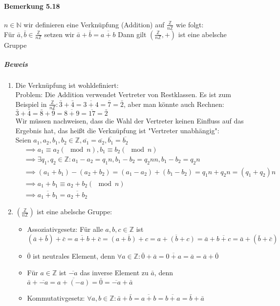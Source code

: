 \documentclass[a4paper]{scrartcl}
\DeclareMathOperator{\Forall}{\forall}
\theoremstyle{definition}
\theoremstyle{plain}
\theoremstyle{plain}
\theoremstyle{remark}
\theoremstyle{remark}
\theoremstyle{remark}
\theoremstyle{remark}
\theoremstyle{remark}
\begin{document}
\paragraph{Bemerkung 5.18}
\label{sec-3-1-7-4}
$n\in\mathbb{N}$ wir definieren eine Verknüpfung (Addition) auf $\frac{\mathbb{Z}}{n\mathbb{Z}}$ wie folgt: \\
         Für $\bar a,\bar b \in\frac{\mathbb{Z}}{n\mathbb{Z}}$ setzen wir $\bar a + \bar b = \overline{a + b}$
Dann gilt $(\frac{\mathbb{Z}}{n\mathbb{Z}},+)$ ist eine abelsche Gruppe
\subparagraph{Beweis}
\label{sec-3-1-7-4-1}
\begin{enumerate}
\item Die Verknüpfung ist wohldefiniert: \\ Problem: Die Addition verwendet Vertreter von Restklassen. Es ist zum Beispiel in $\frac{\mathbb{Z}}{n\mathbb{Z}}: \bar 3 + \bar 4 = \overline{3 + 4} = \bar 7 = \bar 2$, aber man könnte auch Rechnen:
$\bar 3 + \bar 4 = \bar 8 + \bar 9 = \overline{8 + 9} = \overline{17} = \bar 2$ \\
                 Wir müssen nachweisen, dass die Wahl der Vertreter keinen Einfluss auf das Ergebnis hat, das heißt die Verknüpfung ist "Vertreter unabhängig": \\
                 Seien $a_1,a_2 ,b_1,b_2 \in\mathbb{Z},\overline{a_1} = \overline{a_2},\overline{b_1} = \overline{b_2}$
\begin{align}
&\implies a_1 \equiv a_2(\mod n), b_1 \equiv b_2(\mod n) \\
&\implies\exists q_1,q_2\in\mathbb{Z}: a_1 - a_2 = q_1 n, b_1 - b_2 = q_2 n n, b_1 - b_2 = q_2 n \\
&\implies (a_1 + b_1) - (a_2 + b_2) = (a_1 - a_2)+ (b_1 - b_2) = q_1 n + q_2 n = (q_1 + q_2) n \\
&\implies a_1 + b_ 1 \equiv a_2 + b_2 (\mod n) \\
&\implies \overline{a_1 + b_1} = \overline{a_2 + b_2}
\end{align}
\item $(\frac{\mathbb{Z}}{n\mathbb{Z}})$ ist eine abelsche Gruppe:
\begin{itemize}
\item Assoziativgesetz: Für alle $a,b,c\in\mathbb{Z}$ ist
\[(\bar a + \bar b) + \bar c = \overline{a + b} + \bar c = \overline{(a + b) + c} = \overline{a + (b + c)} = \bar a + \overline{b + c} = \bar a + (\bar b + \bar c)\]
\item $\bar 0$ ist neutrales Element, denn $\Forall a\in\mathbb{Z}:\bar 0 + \bar a = \overline{0 + a} = \bar a = \bar a + \bar 0$
\item Für $a\in\mathbb{Z}$ ist $\overline{-a}$ das inverse Element zu $\bar a$, denn $\bar a + \overline{-a} = \overline{a + (- a)} = \bar 0 = \overline{-a} + \bar a$
\item Kommutativgesetz: $\Forall a,b\in\mathbb{Z}:\bar a + \bar b = \overline{a + b} = \overline{b + a} = \bar b + \bar a$
\end{itemize}
\end{enumerate}
\end{document}
